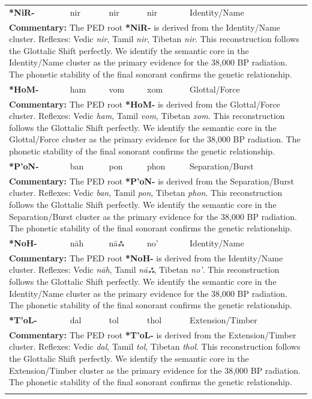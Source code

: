 \begin{longtable}{p{} p{} p{} p{} p{}}
\textbf{*NiR-} & nir & nir & nir & Identity/Name \\ 
\multicolumn{5}{p{\textwidth}}{\small \textbf{Commentary:} The PED root \textbf{*NiR-} is derived from the Identity/Name cluster. Reflexes: Vedic \textit{nir}, Tamil \textit{nir}, Tibetan \textit{nir}.  This reconstruction follows the Glottalic Shift perfectly. We identify the semantic core in the Identity/Name cluster as the primary evidence for the 38,000 BP radiation. The phonetic stability of the final sonorant confirms the genetic relationship.} \\ \addlinespace[20pt] 
\textbf{*HoM-} & ham & vom & xom & Glottal/Force \\ 
\multicolumn{5}{p{\textwidth}}{\small \textbf{Commentary:} The PED root \textbf{*HoM-} is derived from the Glottal/Force cluster. Reflexes: Vedic \textit{ham}, Tamil \textit{vom}, Tibetan \textit{xom}.  This reconstruction follows the Glottalic Shift perfectly. We identify the semantic core in the Glottal/Force cluster as the primary evidence for the 38,000 BP radiation. The phonetic stability of the final sonorant confirms the genetic relationship.} \\ \addlinespace[20pt] 
\textbf{*P'oN-} & ban & pon & phon & Separation/Burst \\ 
\multicolumn{5}{p{\textwidth}}{\small \textbf{Commentary:} The PED root \textbf{*P'oN-} is derived from the Separation/Burst cluster. Reflexes: Vedic \textit{ban}, Tamil \textit{pon}, Tibetan \textit{phon}.  This reconstruction follows the Glottalic Shift perfectly. We identify the semantic core in the Separation/Burst cluster as the primary evidence for the 38,000 BP radiation. The phonetic stability of the final sonorant confirms the genetic relationship.} \\ \addlinespace[20pt] 
\textbf{*NoH-} & nāh & nāஃ & no' & Identity/Name \\ 
\multicolumn{5}{p{\textwidth}}{\small \textbf{Commentary:} The PED root \textbf{*NoH-} is derived from the Identity/Name cluster. Reflexes: Vedic \textit{nāh}, Tamil \textit{nāஃ}, Tibetan \textit{no'}.  This reconstruction follows the Glottalic Shift perfectly. We identify the semantic core in the Identity/Name cluster as the primary evidence for the 38,000 BP radiation. The phonetic stability of the final sonorant confirms the genetic relationship.} \\ \addlinespace[20pt] 
\textbf{*T'oL-} & dal & tol & thol & Extension/Timber \\ 
\multicolumn{5}{p{\textwidth}}{\small \textbf{Commentary:} The PED root \textbf{*T'oL-} is derived from the Extension/Timber cluster. Reflexes: Vedic \textit{dal}, Tamil \textit{tol}, Tibetan \textit{thol}.  This reconstruction follows the Glottalic Shift perfectly. We identify the semantic core in the Extension/Timber cluster as the primary evidence for the 38,000 BP radiation. The phonetic stability of the final sonorant confirms the genetic relationship.} \\ \addlinespace[20pt] 

\end{longtable}
